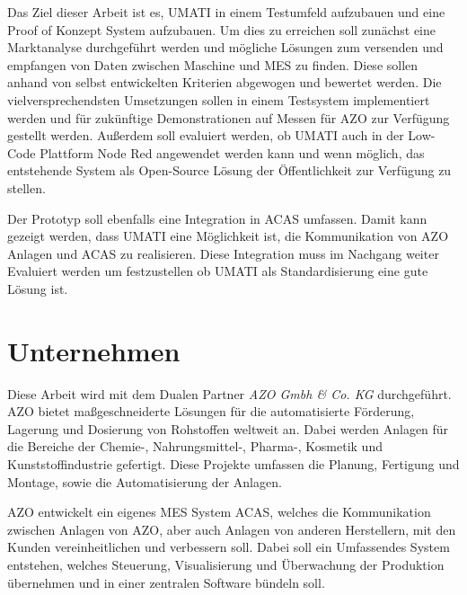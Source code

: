 \documentclass[a4paper, 12pt, oneside]{scrbook}
\begin{document}
	\noindent Das Ziel dieser Arbeit ist es, UMATI in einem Testumfeld aufzubauen und eine Proof of Konzept System aufzubauen. Um dies zu erreichen soll zunächst eine Marktanalyse durchgeführt werden und mögliche Lösungen zum versenden und empfangen von Daten zwischen Maschine und MES zu finden. Diese sollen anhand von selbst entwickelten Kriterien abgewogen und bewertet werden. Die vielversprechendsten Umsetzungen sollen in einem Testsystem implementiert werden und für zukünftige Demonstrationen auf Messen für AZO zur Verfügung gestellt werden. Außerdem soll evaluiert werden, ob UMATI auch in der Low-Code Plattform Node Red angewendet werden kann und wenn möglich, das entstehende System als Open-Source Lösung der Öffentlichkeit zur Verfügung zu stellen.
	
	\noindent Der Prototyp soll ebenfalls eine Integration in ACAS umfassen. Damit kann gezeigt werden, dass UMATI eine Möglichkeit ist, die Kommunikation von AZO Anlagen und ACAS zu realisieren. Diese Integration muss im Nachgang weiter Evaluiert werden um festzustellen ob UMATI als Standardisierung eine gute Lösung ist.
	
	
	
	
	\section{Unternehmen}
	
	
	\noindent Diese Arbeit wird mit dem Dualen Partner \textit{AZO Gmbh \& Co. KG} durchgeführt. AZO bietet maßgeschneiderte Lösungen für die automatisierte Förderung, Lagerung und Dosierung von Rohstoffen weltweit an. Dabei werden Anlagen für die Bereiche der Chemie-, Nahrungsmittel-, Pharma-, Kosmetik und Kunststoffindustrie gefertigt. Diese Projekte umfassen die Planung, Fertigung und Montage, sowie die Automatisierung der Anlagen.
	
	\noindent AZO entwickelt ein eigenes MES System ACAS, welches die Kommunikation zwischen Anlagen von AZO, aber auch Anlagen von anderen Herstellern, mit den Kunden vereinheitlichen und verbessern soll. Dabei soll ein Umfassendes System entstehen, welches Steuerung, Visualisierung und Überwachung der Produktion übernehmen und in einer zentralen Software bündeln soll.
	
\end{document}
